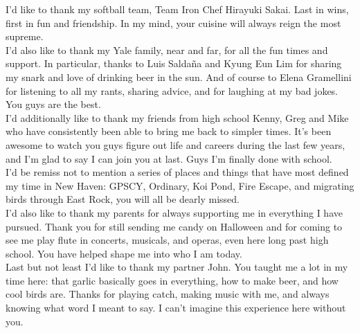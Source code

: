\noindent I'd like to thank my softball team, Team Iron Chef Hirayuki Sakai. Last in wins, first in fun and friendship. In my mind, your cuisine will always reign the most supreme. \\

\noindent I'd also like to thank my Yale family, near and far, for all the fun times and support.  In particular, thanks to Luis Salda\~{n}a and Kyung Eun Lim for sharing my snark and love of drinking beer in the sun. And of course to Elena Gramellini for listening to all my rants, sharing advice, and for laughing at my bad jokes. You guys are the best.\\

\noindent I'd additionally like to thank my friends from high school Kenny, Greg and Mike who have consistently been able to bring me back to simpler times. It's been awesome to watch you guys figure out life and careers during the last few years, and I'm glad to say I can join you at last. Guys I'm finally done with school. \\

\noindent I'd be remiss not to mention a series of places and things that have most defined my time in New Haven: GPSCY, Ordinary, Koi Pond, Fire Escape, and migrating birds through East Rock, you will all be dearly missed. \\

\noindent I'd also like to thank my parents for always supporting me in everything I have pursued. Thank you for still sending me candy on Halloween and for coming to see me play flute in concerts, musicals, and operas, even here long past high school.  You have helped shape me into who I am today. \\

\noindent Last but not least I'd like to thank my partner John. You taught me a lot in my time here: that garlic basically goes in everything, how to make beer, and how cool birds are. Thanks for playing catch, making music with me, and always knowing what word I meant to say. I can't imagine this experience here without you.

\clearpage




\tableofcontents
\clearpage

\listoffigures
\setcounter{tocdepth}{3} 


\clearpage
\renewcommand{\thepage}{\arabic{page}}
\setcounter{page}{1}


